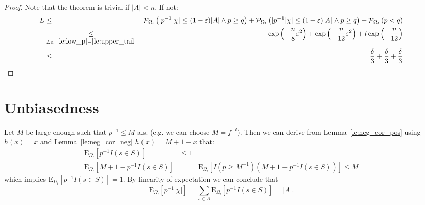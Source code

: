 \documentclass{article}
\newcommand{\prob}{\mathcal P}
\newcommand{\expectation}{\mathrm{E}}
\newcommand{\eps}{\varepsilon}
\theoremstyle{definition}
\begin{document}
\begin{proof}
Note that the theorem is trivial if $|A| < n$. If not:
\begin{eqnarray*}
  L & \leq & \prob_{\Omega_l} \left( | p^{-1} |\chi| \leq (1-\eps) |A| \wedge p \geq q \right) +
    \prob_{\Omega_l} \left( | p^{-1} |\chi| \leq (1+\eps) |A| \wedge p \geq q \right) +
    \prob_{\Omega_l} \left( p < q \right) \\
    & \underset{Le.~\ref{le:low_p}-\ref{le:upper_tail}}{\leq} &
    \exp\left( - \frac{n}{8} \eps^2 \right)  + \exp\left( - \frac{n}{12} \eps^2 \right) + l \exp\left( - \frac{n}{12} \right) \\
    & \leq & \frac{\delta}{3} + \frac{\delta}{3} + \frac{\delta}{3}
\end{eqnarray*}
\end{proof}

\section{Unbiasedness}
Let $M$ be large enough such that $p^{-1} \leq M$ a.s. (e.g. we can choose $M = f^{-l}$). Then we can derive from Lemma~\ref{le:neg_cor_pos} using $h(x) = x$ and Lemma~\ref{le:neg_cor_neg} $h(x) = M+1-x$ that:
\begin{eqnarray*}
  \expectation_{\Omega_l} [ p^{-1} I(s \in S) ] & \leq 1 & \\
  \expectation_{\Omega_l} [ M + 1 - p^{-1} I(s \in S) ] & = & \expectation_{\Omega_l} [ I(p \geq M^{-1}) (M + 1 - p^{-1} I(s \in S)) ] \leq M  
\end{eqnarray*}
which implies $\expectation_{\Omega_l} [ p^{-1} I(s \in S) ] = 1$.
By linearity of expectation we can conclude that
\[
  \expectation_{\Omega_l} [ p^{-1} |\chi| ] = \sum_{s \in A} \expectation_{\Omega_l} [ p^{-1} I(s \in S) ] = |A| \textrm{.}
\]


 
\end{document}
